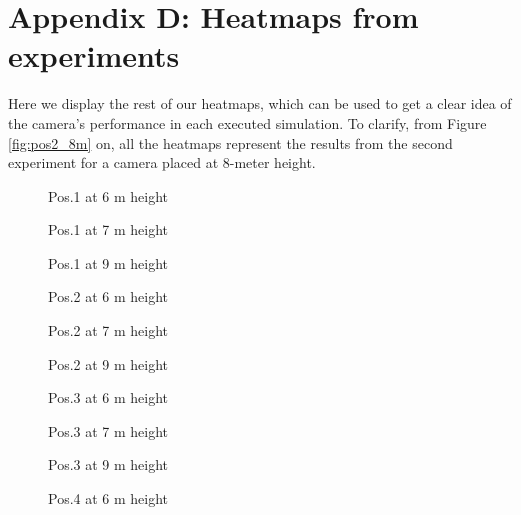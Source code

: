 \newpage
{}
\section*{Appendix D: Heatmaps from experiments} \label{appendix_heatmaps}

Here we display the rest of our heatmaps, which can be used to get a clear idea of the camera's performance in each executed simulation. To clarify, from Figure \ref{fig:pos2_8m} on, all the heatmaps represent the results from the second experiment for a camera placed at 8-meter height.

\begin{figure}[!htb]
  
  \caption{Pos.1 at 6 m height}\label{fig:pos1_6m}
\endminipage\hfill
{}
  
  \caption{Pos.1 at 7 m height}\label{fig:pos1_7m}
\endminipage\hfill
\end{figure}

\begin{figure}[!htb]
  
  \caption{Pos.1 at 9 m height}\label{fig:pos1_9m}
\endminipage\hfill
{}
  
  \caption{Pos.2 at 6 m height}\label{fig:pos2_6m}
\endminipage\hfill
\end{figure}

\begin{figure}[!htb]
  
  \caption{Pos.2 at 7 m height}\label{fig:pos2_7m}
\endminipage\hfill
{}
  
  \caption{Pos.2 at 9 m height}\label{fig:pos2_9m}
\endminipage\hfill
\end{figure}

\begin{figure}[!htb]
  
  \caption{Pos.3 at 6 m height}\label{fig:pos3_6m}
\endminipage\hfill
{}
  
  \caption{Pos.3 at 7 m height}\label{fig:pos3_7m}
\endminipage\hfill
\end{figure}

\begin{figure}[!htb]
  
  \caption{Pos.3 at 9 m height}\label{fig:pos3_9m}
\endminipage\hfill
{}
  
  \caption{Pos.4 at 6 m height}\label{fig:pos4_6m}
\endminipage\hfill
\end{figure}

